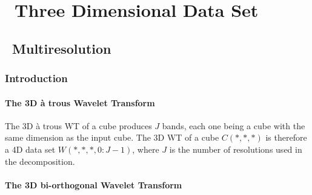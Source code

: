 

\chapter{ \ Three Dimensional Data Set}

\section{ \ Multiresolution}

\subsection{Introduction}
\subsubsection{The 3D \`a trous Wavelet Transform}
The 3D \`a trous WT of a cube produces $J$ bands, each one being
a cube with the same dimension as the input cube.
The 3D WT of a cube $C(*,*,*)$ is therefore a 4D data set
$W(*,*,*,0:J-1)$, where $J$ is the number of 
resolutions used in the decomposition.

\subsubsection{The 3D bi-orthogonal Wavelet Transform}

